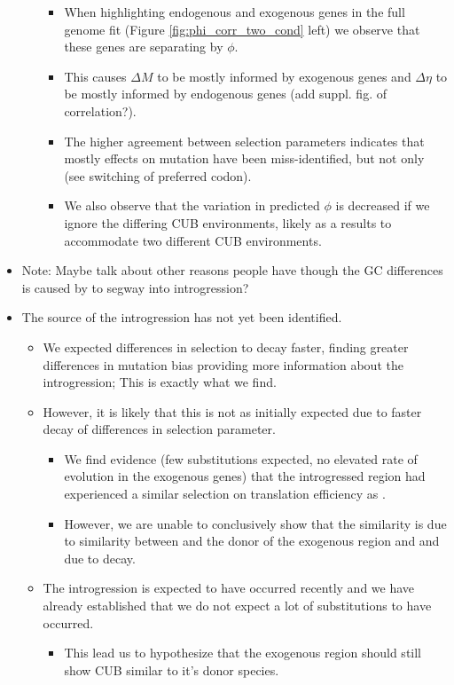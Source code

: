 \documentclass[12pt]{article}
\begin{document}
\begin{itemize}
\begin{itemize}
\begin{itemize}
			\item When highlighting endogenous and exogenous genes in the full genome fit (Figure \ref{fig:phi_corr_two_cond} left) we observe that these genes are separating by $\phi$.
			\item This causes $\Delta M$ to be mostly informed by exogenous genes and $\Delta \eta$ to be mostly informed by endogenous genes (add suppl. fig. of correlation?).
			\item The higher agreement between selection parameters indicates that mostly effects on mutation have been miss-identified, but not only (see switching of preferred codon).
			\item We also observe that the variation in predicted $\phi$ is decreased if we ignore the differing CUB environments, likely as a results to accommodate two different CUB environments.
		\end{itemize}
	\end{itemize}
	\item Note: Maybe talk about other reasons people have though the GC differences is caused by to segway into introgression?
	\item The source of the introgression has not yet been identified.
	\begin{itemize}
		\item We expected differences in selection to decay faster, finding greater differences in mutation bias providing more information about the introgression; This is exactly what we find.
		\item However, it is likely that this is not as initially expected due to faster decay of differences in selection parameter.
		\begin{itemize}
			\item We find evidence (few substitutions expected, no elevated rate of evolution in the exogenous genes) that the introgressed region had experienced a similar selection on translation efficiency as \kluyveri.
			\item However, we are unable to conclusively show that the similarity is due to similarity between \kluyveri and the donor of the exogenous region and and due to decay.
		\end{itemize}
		\item The introgression is expected to have occurred recently and we have already established that we do not expect a lot of substitutions to have occurred.
		\begin{itemize}
			\item This lead us to hypothesize that the exogenous region should still show CUB similar to it's donor species.

\end{itemize}
\end{itemize}
\end{itemize}
\end{document}
